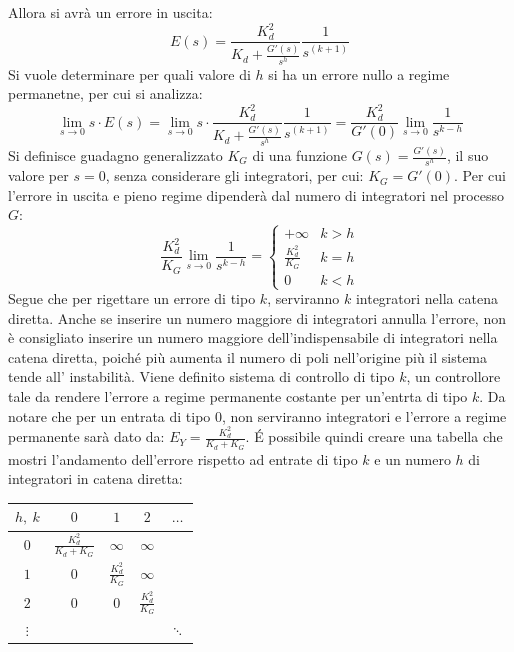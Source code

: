 \documentclass{article}
\numberwithin{equation}{subsection}
\begin{document}
Allora si avrà un errore in uscita:
\begin{equation}
    E(s)=\displaystyle\frac{K_d^2}{K_d+\displaystyle\frac{G'(s)}{s^h}}\frac{1}{s^{(k+1)}}
\end{equation}
Si vuole determinare per quali valore di $h$ si ha un errore nullo a regime permanetne, per cui si analizza: 
\begin{equation}
    \lim_{s\to0}s\cdot E(s)=\lim_{s\to0}s\cdot\displaystyle\frac{K_d^2}{K_d+\displaystyle\frac{G'(s)}{s^h}}\frac{1}{s^{(k+1)}}=\frac{K_d^2}{G'(0)}\lim_{s\to0}\frac{1}{s^{k-h}}
\end{equation}
Si definisce guadagno generalizzato $K_G$ di una funzione $G(s)=\displaystyle\frac{G'(s)}{s^h}$, il suo valore per $s=0$, senza considerare gli integratori, per cui: $K_G=G'(0)$. 
Per cui l'errore in uscita e pieno regime dipenderà dal numero di integratori nel processo $G$:
\begin{equation}
    \displaystyle\frac{K_d^2}{K_G}\lim_{s\to0}\frac{1}{s^{k-h}}=
    \begin{cases}
        +\infty &k>h\\
        \displaystyle\frac{K_d^2}{K_G} &k=h\\
        0 &k<h
    \end{cases}
\end{equation}
Segue che per rigettare un errore di tipo $k$, serviranno $k$ integratori nella catena diretta. Anche se inserire un numero maggiore di integratori annulla l'errore, non è 
consigliato inserire un numero maggiore dell'indispensabile di integratori nella catena diretta, poiché più aumenta il numero di poli nell'origine più il sistema tende all'
instabilità. Viene definito sistema di controllo di tipo $k$, un controllore tale da rendere l'errore a regime permanente costante per un'entrta di tipo $k$. Da notare che 
per un entrata di tipo $0$, non serviranno integratori e l'errore a regime permanente sarà dato da: $E_Y=\displaystyle\frac{K_d^2}{K_d+K_G}$. \'{E} possibile quindi 
creare una tabella che mostri l'andamento dell'errore rispetto ad entrate di tipo $k$ e un numero $h$ di integratori in catena diretta:

\begin{center}
    \begin{tabular}{|c|c|c|c|c}
        \hline
        $h,\:k$ & $0$ & $1$ & $2$ & $\ldots$\\[0.5ex]
        \hline
        $0$ & $\displaystyle\frac{K_d^2}{K_d+K_G}$ & $\infty$ &$\infty$\\[0.5ex]
        \hline
        $1$ & $0$ & $\displaystyle\frac{K_d^2}{K_G}$ & $\infty$\\[0.5ex]
        \hline
        $2$ & $0$ & $0$ & $\displaystyle\frac{K_d^2}{K_G}$\\[0.5ex]
        \hline
        $\vdots$ & & & & $\ddots$\\
    \end{tabular}
\end{center}
\end{document}
